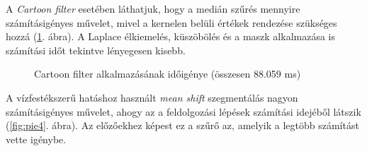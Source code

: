 
A \textit{Cartoon filter} esetében láthatjuk, hogy a medián szűrés mennyire számításigényes művelet, mivel a kernelen belüli értékek rendezése szükséges hozzá (\ref{fig:pie3}. ábra). A Laplace élkiemelés, küszöbölés és a maszk alkalmazása is számítási időt tekintve lényegesen kisebb.


\begin{figure}[h!]
\centering
{}
\caption{Cartoon filter alkalmazásának időigénye (összesen 88.059 ms)}
\label{fig:pie3}
\end{figure}


A vízfestékszerű hatáshoz használt \textit{mean shift} szegmentálás nagyon számításigényes művelet, ahogy az a feldolgozási lépések számítási idejéből látszik (\ref{fig:pie4}. ábra). Az előzőekhez képest ez a szűrő az, amelyik a legtöbb számítást vette igénybe.


